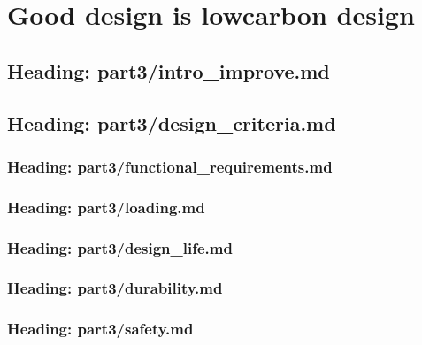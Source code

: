 \documentclass[letterpaper,10pt,english]{jupyterBook}
\begin{document}
\part{Good design is low\sphinxhyphen{}carbon design}

\sphinxstepscope


\chapter{Heading: part3/intro\_improve.md}
\label{\detokenize{part3/intro_improve:heading-part3-intro-improve-md}}\label{\detokenize{part3/intro_improve::doc}}
\sphinxstepscope


\chapter{Heading: part3/design\_criteria.md}
\label{\detokenize{part3/design_criteria:heading-part3-design-criteria-md}}\label{\detokenize{part3/design_criteria::doc}}
\sphinxstepscope


\section{Heading: part3/functional\_requirements.md}
\label{\detokenize{part3/functional_requirements:heading-part3-functional-requirements-md}}\label{\detokenize{part3/functional_requirements::doc}}
\sphinxstepscope


\section{Heading: part3/loading.md}
\label{\detokenize{part3/loading:heading-part3-loading-md}}\label{\detokenize{part3/loading::doc}}
\sphinxstepscope


\section{Heading: part3/design\_life.md}
\label{\detokenize{part3/design_life:heading-part3-design-life-md}}\label{\detokenize{part3/design_life::doc}}
\sphinxstepscope


\section{Heading: part3/durability.md}
\label{\detokenize{part3/durability:heading-part3-durability-md}}\label{\detokenize{part3/durability::doc}}
\sphinxstepscope


\section{Heading: part3/safety.md}
\label{\detokenize{part3/safety:heading-part3-safety-md}}\label{\detokenize{part3/safety::doc}}
\sphinxstepscope
\end{document}
